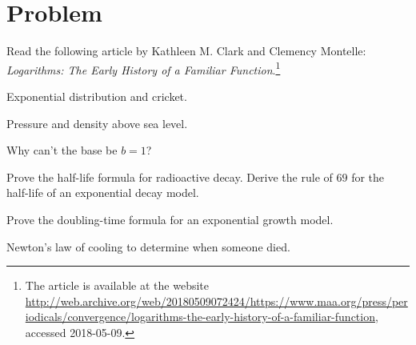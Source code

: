 \documentclass[a4paper,oneside,12pt]{article}
\begin{document}
\newpage

\section*{Problem}

\begin{problem}
\item Read the following article by Kathleen M. Clark and Clemency
  Montelle:
  \emph{Logarithms: The Early History of a Familiar Function}.\footnote{
    The article is available at the website
    \url{http://web.archive.org/web/20180509072424/https://www.maa.org/press/periodicals/convergence/logarithms-the-early-history-of-a-familiar-function},
    accessed 2018-05-09.
  }

\item Exponential distribution and cricket.

\item Pressure and density above sea level.

\item Why can't the base be $b = 1$?

\item Prove the half-life formula for radioactive decay.  Derive the
  rule of $69$ for the half-life of an exponential decay model.

\item Prove the doubling-time formula for an exponential growth
  model.

\item Newton's law of cooling to determine when someone died.
\end{problem}
\end{document}
